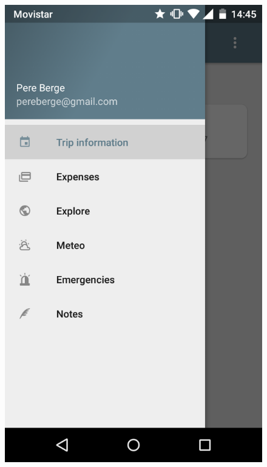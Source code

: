 \begin{itemize}
\begin{figure}[!h]
\centering
\includegraphics[scale=0.15]{Figures/Drawer.png}

\end{figure}
\end{itemize}
